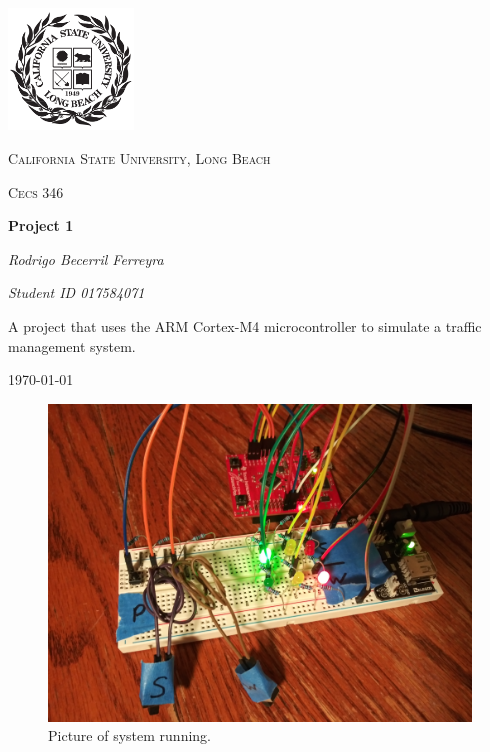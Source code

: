 \documentclass{article}
\begin{document}
\begin{titlepage}
	\centering
	\includegraphics[width=0.25\textwidth]{Images/247px-CSU-Longbeach_seal}\par\vspace{1cm}
	{\scshape\Large California State University, Long Beach \par}
	\vspace{1cm}
	{\scshape\Large Cecs 346\par}
	\vspace{1.5cm}
	{\huge\bfseries Project 1\par}
	\vspace{2cm}
    {\Large\itshape Rodrigo Becerril Ferreyra\par}
    {\itshape\Large Student ID 017584071 \par}
	\vfill
    A project that uses the ARM Cortex-M4 microcontroller to
    simulate a traffic management system.

	\vfill

	{\large \today\par}
\end{titlepage}

\begin{figure}[H]
    \centering
    \includegraphics[width=\textwidth]{Images/20201028_020228}
    \caption{Picture of system running.}
    \label{system}
\end{figure}
\end{document}
